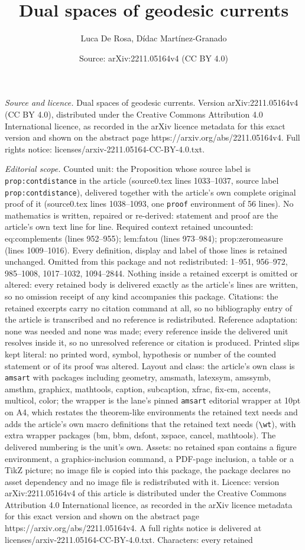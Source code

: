 \documentclass[10pt,a4paper]{amsart}
\title[Dual spaces of geodesic currents]{Dual spaces of geodesic currents}
\author{Luca De Rosa, D\'idac Mart\'inez-Granado}
\date{Source: arXiv:2211.05164v4 (CC BY 4.0)}
\begin{document}
\maketitle

\noindent\emph{Source and licence.} Dual spaces of geodesic currents. Version arXiv:2211.05164v4 (CC BY 4.0), distributed under the Creative Commons Attribution 4.0 International licence, as recorded in the arXiv licence metadata for this exact version and shown on the abstract page https://arxiv.org/abs/2211.05164v4. Full rights notice: licenses/arxiv-2211.05164-CC-BY-4.0.txt.\par\smallskip

\noindent\textit{Editorial scope.} Counted unit: the Proposition whose source label is \texttt{prop:contdistance} in the article (source0.tex lines 1033--1037, source label \texttt{prop:contdistance}), delivered together with the article's own complete original proof of it (source0.tex lines 1038--1093, one \texttt{proof} environment of 56 lines). No mathematics is written, repaired or re-derived: statement and proof are the article's own text line for line. Required context retained uncounted: eq:complements (lines 952--955); lem:fatou (lines 973--984); prop:zeromeasure (lines 1009--1016). Every definition, display and label of those lines is retained unchanged. Omitted from this package and not redistributed: 1--951, 956--972, 985--1008, 1017--1032, 1094--2844. Nothing inside a retained excerpt is omitted or altered: every retained body is delivered exactly as the article's lines are written, so no omission receipt of any kind accompanies this package. Citations: the retained excerpts carry no citation command at all, so no bibliography entry of the article is transcribed and no reference is redistributed. Reference adaptation: none was needed and none was made; every reference inside the delivered unit resolves inside it, so no unresolved reference or citation is produced. Printed slips kept literal: no printed word, symbol, hypothesis or number of the counted statement or of its proof was altered. Layout and class: the article's own class is \texttt{amsart} with packages including geometry, amsmath, latexsym, amssymb, amsthm, graphicx, mathtools, caption, subcaption, xfrac, fix-cm, accents, multicol, color; the wrapper is the lane's pinned \texttt{amsart} editorial wrapper at 10pt on A4, which restates the theorem-like environments the retained text needs and adds the article's own macro definitions that the retained text needs (\texttt{\textbackslash wt}), with extra wrapper packages (bm, bbm, dsfont, xspace, cancel, mathtools). The delivered numbering is the unit's own. Assets: no retained span contains a figure environment, a graphics-inclusion command, a PDF-page inclusion, a table or a TikZ picture; no image file is copied into this package, the package declares no asset dependency and no image file is redistributed with it. Licence: version arXiv:2211.05164v4 of this article is distributed under the Creative Commons Attribution 4.0 International licence, as recorded in the arXiv licence metadata for this exact version and shown on the abstract page https://arxiv.org/abs/2211.05164v4. A full rights notice is delivered at licenses/arxiv-2211.05164-CC-BY-4.0.txt. Characters: every retained 
\end{document}
